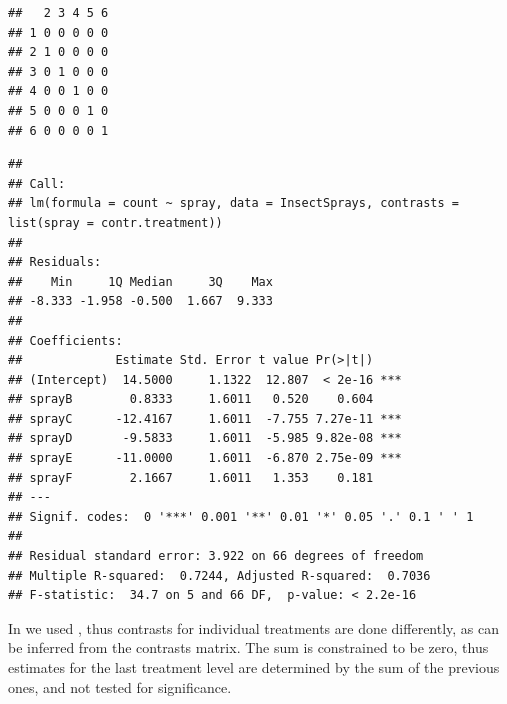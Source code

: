 \documentclass[krantz2]{krantz}\usepackage{knitr}
\begin{document}
\begin{knitrout}\footnotesize
{}\color{fgcolor}\begin{kframe}
\begin{alltt}
\hlstd{(}\hlstd{(}\hlopt{$}
\end{alltt}
\begin{verbatim}
##   2 3 4 5 6
## 1 0 0 0 0 0
## 2 1 0 0 0 0
## 3 0 1 0 0 0
## 4 0 0 1 0 0
## 5 0 0 0 1 0
## 6 0 0 0 0 1
\end{verbatim}
\end{kframe}
\end{knitrout}

\begin{knitrout}\footnotesize
{}\color{fgcolor}\begin{kframe}
\begin{alltt}
\end{alltt}
\begin{verbatim}
## 
## Call:
## lm(formula = count ~ spray, data = InsectSprays, contrasts = list(spray = contr.treatment))
## 
## Residuals:
##    Min     1Q Median     3Q    Max 
## -8.333 -1.958 -0.500  1.667  9.333 
## 
## Coefficients:
##             Estimate Std. Error t value Pr(>|t|)    
## (Intercept)  14.5000     1.1322  12.807  < 2e-16 ***
## sprayB        0.8333     1.6011   0.520    0.604    
## sprayC      -12.4167     1.6011  -7.755 7.27e-11 ***
## sprayD       -9.5833     1.6011  -5.985 9.82e-08 ***
## sprayE      -11.0000     1.6011  -6.870 2.75e-09 ***
## sprayF        2.1667     1.6011   1.353    0.181    
## ---
## Signif. codes:  0 '***' 0.001 '**' 0.01 '*' 0.05 '.' 0.1 ' ' 1
## 
## Residual standard error: 3.922 on 66 degrees of freedom
## Multiple R-squared:  0.7244,	Adjusted R-squared:  0.7036 
## F-statistic:  34.7 on 5 and 66 DF,  p-value: < 2.2e-16
\end{verbatim}
\end{kframe}
\end{knitrout}

In  we used , thus contrasts for individual treatments are done differently, as can be inferred from the contrasts matrix. The sum is constrained to be zero, thus estimates for the last treatment level are determined by the sum of the previous ones, and not tested for significance.
\end{document}
